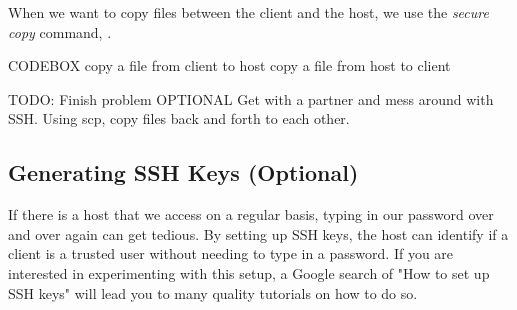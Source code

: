 When we want to copy files between the client and the host, we use the  \emph{secure copy} command, .

CODEBOX
copy a file from client to host
copy a file from host to client

\begin{problem}
TODO: Finish problem
OPTIONAL
Get with a partner and mess around with SSH. Using scp, copy files back and forth to each other.
\end{problem}

\subsection*{Generating SSH Keys (Optional)}
If there is a host that we access on a regular basis, typing in our password over and over again can get tedious. By setting up SSH keys, the host can identify if a client is a trusted user without needing to type in a password. If you are interested in experimenting with this setup, a Google search of "How to set up SSH keys" will lead you to many quality tutorials on how to do so.
